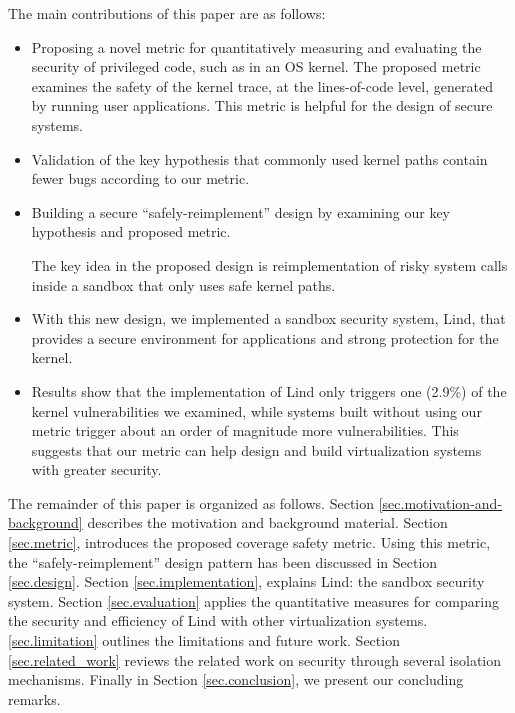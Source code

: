 The main contributions of this paper are as follows: %
\begin{itemize}
\item Proposing a novel metric for quantitatively measuring and evaluating the
security of privileged code, such as in an OS kernel. The proposed metric examines
the safety of the kernel trace, at the lines-of-code level, generated by
running user applications. This metric is helpful for the design of secure systems.
\item Validation of the key hypothesis that commonly used kernel paths contain fewer bugs according to our metric.
 
\item Building a secure ``safely-reimplement'' design by examining our key hypothesis and proposed metric. 

The key idea in the proposed design is reimplementation of risky system calls inside a
sandbox that only uses safe kernel paths. 
\item With this new design, we implemented a sandbox security system, Lind, that
provides a secure environment for applications and strong protection for
the kernel.
\item Results show that the implementation of Lind only triggers one (2.9\%) of
the kernel vulnerabilities we examined, while systems built without using
our metric trigger about an order of magnitude more vulnerabilities. This
suggests that our metric can help design and build virtualization systems
with greater security. 
\end{itemize}


The remainder of this paper is organized as follows. 
Section \ref{sec.motivation-and-background} describes the motivation and background material. Section \ref{sec.metric}, introduces the proposed coverage safety metric. Using this metric, the 
``safely-reimplement'' design pattern has been discussed in Section \ref{sec.design}. Section \ref{sec.implementation}, explains Lind: the sandbox security system. Section \ref{sec.evaluation} applies the quantitative  measures for comparing the security and efficiency of Lind with other virtualization systems. \ref{sec.limitation} outlines the limitations and future work. Section \ref{sec.related_work} reviews the related work on security through several isolation mechanisms. Finally in Section \ref{sec.conclusion}, we present our concluding remarks.

